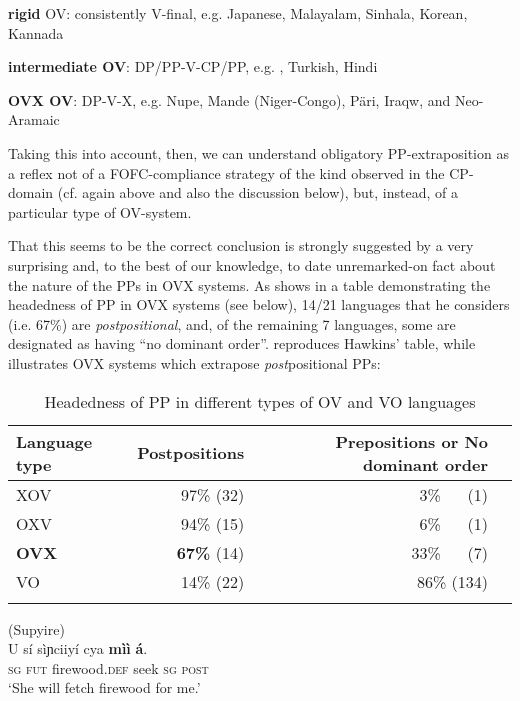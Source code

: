 \documentclass[output=paper]{LSP/langsci}
\begin{document}
\ea%
    \label{ex:biberauer:27} 

	 \ea\textbf{rigid} OV: consistently V-final, e.g. Japanese, Malayalam, Sinhala, Korean, Kannada

 \ex  \textbf{intermediate OV}: DP/PP-V-CP/PP, e.g. , Turkish, Hindi

 \ex  \textbf{OVX OV}: DP-V-X, e.g. Nupe, Mande (Niger-Congo), Päri, Iraqw, and Neo-Aramaic 
\z
\z

Taking this into account, then, we can understand obligatory PP-extraposition as a reflex not of a FOFC-compliance strategy of the kind observed in the CP-domain (cf. again  above and also the discussion below), but, instead, of a particular type of OV-system. 

That this seems to be the correct conclusion is strongly suggested by a very surprising and, to the best of our knowledge, to date unremarked-on fact about the nature of the PPs in OVX systems. As \citet[183]{Hawkins2008} shows in a table demonstrating the headedness of PP in OVX systems (see  below), 14/21 languages that he considers (i.e. 67\%) are \textit{postpositional}, and, of the remaining 7 languages, some are designated as having “no dominant order”.  reproduces Hawkins’ table, while  illustrates OVX systems which extrapose \textit{post}positional PPs:

  \begin{table}   
 \caption{Headedness of PP in different types of OV and VO languages}
    \label{tab:biberauer:28}
	  \label{tab:biberauer:1}
\begin{tabular}{lrrc}
\lsptoprule
Language type & \multicolumn{1}{c}{Postpositions} & Prepositions or No dominant order \\
\midrule
XOV           &   97\%         (32) & 3\% ~~  (1)  \\
 OXV          & 94\%           (15) & 6\% ~~  (1)  \\ 
\textbf{OVX}  &  \textbf{67\%} (14) & 33\% ~~ (7)   \\
 VO           &    14\%        (22) & 86\%  (134)  \\
\lspbottomrule
\end{tabular}
\end{table}\pagebreak[3]


\ea %
\label{ex:biberauer:29} 
 \ea (Supyire)\\
\gll  U     sí     sìɲciiyí           cya   \textbf{mìì} \textbf{á}. \\
    \textsc{sg}  \textsc{fut} firewood.\textsc{def} seek \textsc{sg} \textsc{post}\\
  \glt ‘She will fetch firewood for me.’    \citep[274]{Carlson1994}
\end{document}
